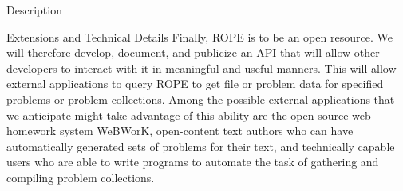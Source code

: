 \documentclass[11pt]{article}
\begin{document}
\begin{section}{Description}
\begin{subsection}{Extensions and Technical Details}
Finally, ROPE is to be an open resource.  We will therefore develop,
document, and publicize an API that will allow other developers to interact
with it in meaningful and useful manners.  This will allow external
applications to query ROPE to get file or problem data for specified
problems or problem collections.  Among the possible external applications
that we anticipate might take advantage of this ability are
the open-source web homework system WeBWorK, open-content text authors who
can have automatically generated sets of problems for their text, and
technically capable users who are able to write programs to automate the
task of gathering and compiling problem collections.

\end{subsection}

\end{section}
\end{document}
